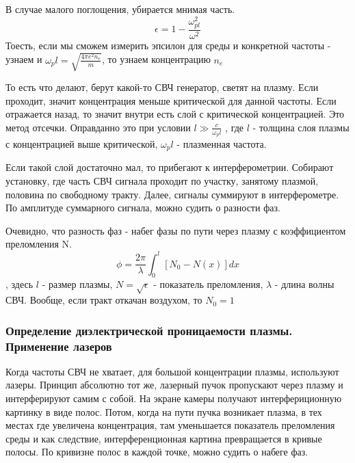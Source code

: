 \documentclass[10pt, a4paper]{article}
\begin{document}
В случае малого поглощения, убирается мнимая часть.
\begin{equation}
	\epsilon = 1- \frac{\omega_{pl}^{2}}{\omega^{2}} 
\end{equation} 
Тоесть, если мы сможем измерить эпсилон для среды и конкретной частоты - узнаем и $\omega_pl = \sqrt{\frac{4 \pi e^{2} n_e}{m}}$, то узнаем концентрацию $n_e$

То есть что делают, берут какой-то СВЧ генератор, светят на плазму. Если проходит, значит концентрация меньше критической для данной частоты. Если отражается назад, то значит внутри есть слой с критической концентрацией. Это метод отсечки.
Оправданно это при условии $l \gg \frac{c}{\omega_pl}$
, где $l$ - толщина слоя плазмы с концентрацией выше критической, $\omega_pl$ - плазменная частота.

Если такой слой достаточно мал, то прибегают к интерферометрии. Собирают установку, где часть СВЧ сигнала проходит по участку, занятому плазмой, половина по свободному тракту. Далее, сигналы суммируют в интерферометре. По амплитуде суммарного сигнала, можно судить о разности фаз.
 
\begin{figure}[h!]
\end{figure}
 
 Очевидно, что разность фаз - набег фазы по пути через плазму с коэффициентом преломления N.
 \begin{equation}
 	\phi = \frac{2 \pi}{\lambda} \int_{0}^{l} [N_0 - N(x)] dx 
 \end{equation} 
, здесь $l$ - размер плазмы, $N=\sqrt{\epsilon}$ - показатель преломления, $\lambda$ - длина волны СВЧ. Вообще, если тракт откачан воздухом, то $N_0 =1$


\subsubsection{Определение диэлектрической проницаемости плазмы. Применение лазеров}
\label{11.5}
Когда частоты СВЧ не хватает, для большой концентрации плазмы, используют лазеры.
Принцип абсолютно тот же, лазерный пучок пропускают через плазму и интерферируют самим с собой. На экране камеры получают интерфериционную картинку в виде полос. Потом, когда на пути пучка возникает плазма, в тех местах где увеличена концентрация, там уменьшается показатель преломления среды и как следствие, интерференционная картина превращается в кривые полосы. По кривизне полос в каждой точке, можно судить о набеге фаз.
\end{document}
